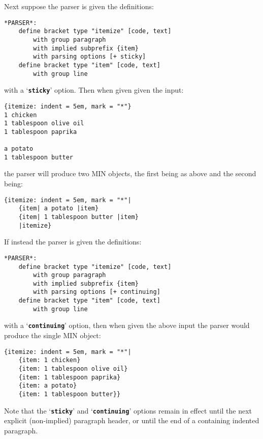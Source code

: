 \documentclass[12pt]{article}
\newcommand{\TT}[1]{{\tt \bfseries #1}}
\newenvironment{indpar}[1][0.3in]%
	{\begin{list}{}%
		     {\setlength{\itemsep}{0in}%
		      \setlength{\topsep}{0in}%
		      \setlength{\parsep}{1ex}%
		      \setlength{\labelwidth}{#1}%
		      \setlength{\leftmargin}{#1}%
		      \addtolength{\leftmargin}{\labelsep}}%
	 \item}%
	{\end{list}}
\begin{document}
Next suppose the parser is given the definitions:
\begin{indpar}\begin{verbatim}
*PARSER*:
    define bracket type "itemize" [code, text]
        with group paragraph
        with implied subprefix {item}
        with parsing options [+ sticky]
    define bracket type "item" [code, text]
        with group line
\end{verbatim}\end{indpar}
with a `\TT{sticky}' option.  Then when given given the input:
\begin{indpar}\begin{verbatim}
{itemize: indent = 5em, mark = "*"}
1 chicken
1 tablespoon olive oil
1 tablespoon paprika

a potato
1 tablespoon butter
\end{verbatim}\end{indpar}
the parser will produce two MIN objects, the first being as
above and the second being:
\begin{indpar}\begin{verbatim}
{itemize: indent = 5em, mark = "*"|
    {item| a potato |item}
    {item| 1 tablespoon butter |item}
    |itemize}
\end{verbatim}\end{indpar}

If instead the parser is given the definitions:
\begin{indpar}\begin{verbatim}
*PARSER*:
    define bracket type "itemize" [code, text]
        with group paragraph
        with implied subprefix {item}
        with parsing options [+ continuing]
    define bracket type "item" [code, text]
        with group line
\end{verbatim}\end{indpar}
with a `\TT{continuing}' option, then when given the above input
the parser would produce the single MIN object:
\begin{indpar}\begin{verbatim}
{itemize: indent = 5em, mark = "*"|
    {item: 1 chicken}
    {item: 1 tablespoon olive oil}
    {item: 1 tablespoon paprika}
    {item: a potato}
    {item: 1 tablespoon butter}}
\end{verbatim}\end{indpar}

Note that the `\TT{sticky}' and `\TT{continuing}' options
remain in effect until the next explicit (non-implied)
paragraph header, or until the end of a containing
indented paragraph.
\end{document}
